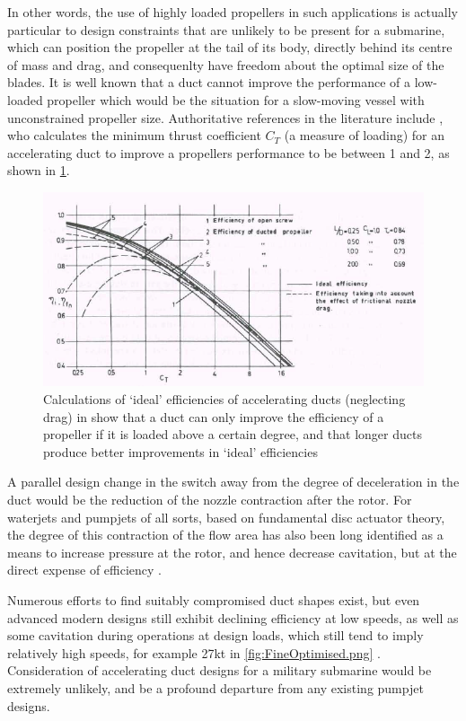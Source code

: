 \documentclass{article}\usepackage[]{graphicx}\usepackage[]{color}
\begin{document}
In other words, the use of highly loaded propellers in such applications is actually particular to design constraints that are unlikely to be present for a submarine, which can position the propeller at the tail of its body, directly behind its centre of mass and drag, and consequenlty have freedom about the optimal size of the blades.  It is well known that a duct cannot improve the performance of a low-loaded propeller which would be the situation for a slow-moving vessel with unconstrained propeller size.  Authoritative references in the literature include \cite{oosterveld1970}, who calculates the minimum thrust coefficient $C_T$ (a measure of loading) for an accelerating duct to improve a propellers performance to be between 1 and 2, as shown in \ref{fig:AcceleratingIdeal.png}.

\begin{figure}[h] \captionsetup{width=0.8\textwidth}
\includegraphics[width=\textwidth]{AcceleratingIdeal.png}
\caption{Calculations of `ideal' efficiencies of accelerating ducts (neglecting drag) in \cite{oosterveld1970} show that a duct can only improve the efficiency of a propeller if it is loaded above a certain degree, and that longer ducts produce better improvements in `ideal' efficiencies}
\label{fig:AcceleratingIdeal.png}
\end{figure}

A parallel design change in the switch away from the degree of deceleration in the duct would be the reduction of the nozzle contraction after the rotor.  For waterjets and pumpjets of all sorts, based on fundamental disc actuator theory, the degree of this contraction of the flow area has also been long identified as a means to increase pressure at the rotor, and hence decrease cavitation, but at the direct expense of efficiency \parencite[14]{van1996waterjet}.

Numerous efforts to find suitably compromised duct shapes exist, but even advanced modern designs still exhibit declining efficiency at low speeds, as well as some cavitation during operations at design loads, which still tend to imply relatively high speeds, for example 27kt in \ref{fig:FineOptimised.png} .  Consideration of accelerating duct designs for a military submarine would be extremely unlikely, and be a profound departure from any existing pumpjet designs.
\end{document}
